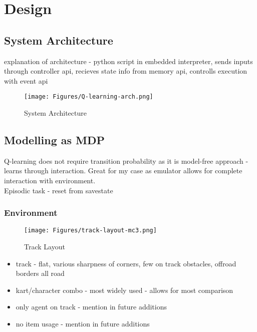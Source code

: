 \chapter{Design}
\section{System Architecture}
explanation of architecture - python script in embedded interpreter, sends inputs through controller api, recieves state info from memory api, controlls execution with event api
\begin{figure}[h]
    \centering
    \texttt{[image: Figures/Q-learning-arch.png]}
    \caption{System Architecture}
    \label{fig:q-learning-arch}
\end{figure}
\section{Modelling as MDP}
Q-learning does not require transition probability as it is model-free approach - learns through interaction. Great for my case as emulator allows for complete interaction with environment.
\\Episodic task - reset from savestate
\cite{watkins1992q}
\subsection{Environment}
\begin{figure}
    \centering
    \texttt{[image: Figures/track-layout-mc3.png]}
    \caption{Track Layout}
    \label{fig:track-layout}
\end{figure}
\begin{itemize}
    \item track - flat, various sharpness of corners, few on track obstacles, offroad borders all road
    \item kart/character combo - most widely used - allows for most comparison
    \item only agent on track - mention in future additions
    \item no item usage - mention in future additions
\end{itemize}

